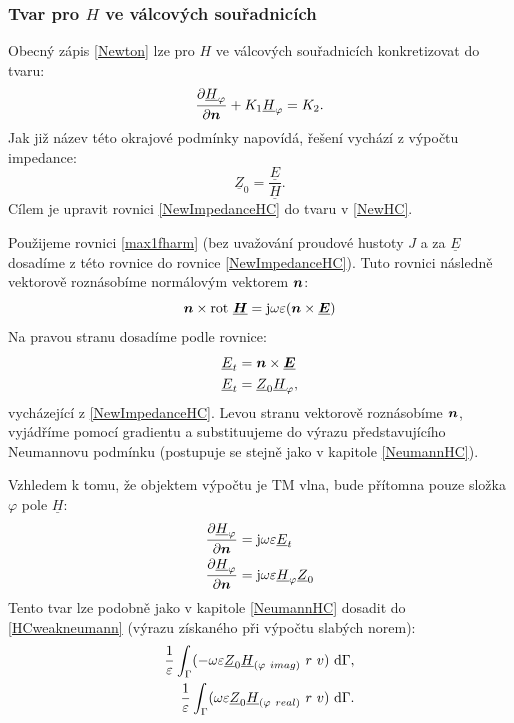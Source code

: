 \documentclass[12pt,a4paper,oneside]{article}
\numberwithin{equation}{section} %
\numberwithin{figure}{section} %
\numberwithin{table}{section} %
\newcommand{\mj}{\mathrm{j}} %
\renewcommand{\vec}[1]{\mbox{\boldmath$#1$}} %
\newcommand{\faz}[1]{{\underline{#1}}} %
\newcommand{\rot}{\mathrm{rot}\ }
\begin{document}
\subsubsection*{Tvar pro \faz{\vec{H}} ve válcových souřadnicích}
Obecný zápis \ref{Newton} lze pro \faz{\vec{H}} ve válcových souřadnicích konkretizovat do tvaru:
\begin{equation}
\label{NewHC}
\frac{\partial \faz{H} _{\varphi}}{\partial \vec{n}} + K_1 \faz{H} _{\varphi} = K_2 .
\end{equation}
Jak již název této okrajové podmínky napovídá, řešení vychází z výpočtu impedance: 
\begin{equation}
\label{NewImpedanceHC}
\faz{Z} _0 = \frac{\faz{E}}{\faz{H}} .
\end{equation}
Cílem je upravit rovnici \ref{NewImpedanceHC} do tvaru v \ref{NewHC}.

Použijeme rovnici \ref{max1fharm} (bez uvažování proudové hustoty $J$ a za $\faz{E}$ dosadíme z této rovnice do rovnice \ref{NewImpedanceHC}). Tuto rovnici následně vektorově roznásobíme normálovým vektorem $\vec{n}$:
\begin{equation}
\vec{n} \times \rot \faz{\vec{H}} = \mj \omega \varepsilon (\vec{n} \times \faz{\vec{E}})
\end{equation}
Na pravou stranu dosadíme podle rovnice:
\begin{subequations}
\begin{align}
\faz{E} _t &= \vec{n} \times \faz{\vec{E}}
\\
\faz{E} _t &= \faz{Z} _0 \faz{H} _{\varphi} ,
\end{align}
\end{subequations}
vycházející z \ref{NewImpedanceHC}. Levou stranu vektorově roznásobíme $\vec{n}$, vyjádříme pomocí gradientu a substituujeme do výrazu představujícího Neumannovu podmínku (postupuje se stejně jako v kapitole \ref{NeumannHC}).

Vzhledem k tomu, že objektem výpočtu je TM vlna, bude přítomna pouze složka $\varphi$ pole $\faz{H}$:
\begin{subequations}
\begin{align}
\frac{\partial \faz{H} _{\varphi}}{\partial \vec{n}} &= \mj \omega \varepsilon \faz{E} _t
\\
\frac{\partial \faz{H} _{\varphi}}{\partial \vec{n}} &= \mj \omega \varepsilon \faz{H} _{\varphi}\faz{Z} _0
\end{align}
\end{subequations}
Tento tvar lze podobně jako v kapitole \ref{NeumannHC} dosadit do \ref{HCweakneumann} (výrazu získaného při výpočtu slabých norem):
\begin{subequations}
\begin{align}
\frac{1}{\varepsilon} \int _{\Gamma} ( - \omega \varepsilon \faz{Z} _0 \faz{H} _{(\varphi ~ imag)} ~ r ~ v ) ~ \ud \Gamma ,
\\ 
\frac{1}{\varepsilon} \int _{\Gamma} ( \omega \varepsilon \faz{Z} _0\faz{H} _{(\varphi ~ real)} ~ r ~ v ) ~ \ud \Gamma .
\end{align}
\end{subequations}
\end{document}
